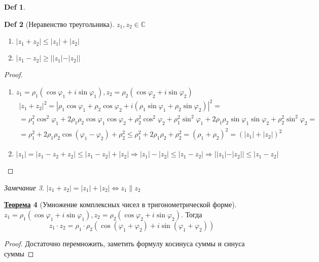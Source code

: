 \documentclass[12pt]{article}
\newenvironment{MyList}[1][4pt]{
  \begin{enumerate}[1.]
  \setlength{\parskip}{0pt}
  \setlength{\itemsep}{#1}
}{       
  \end{enumerate}
}
\def\C{\mathbb{C}}       %
\def\PHI{\varphi}        %
\def\SO{\Rightarrow}     %
\def\EQ{\Leftrightarrow} %
\def\Pagebreak{\pagebreak\vspace*{-1.5em}}
\theoremstyle{definition} %
\newtheorem{Thm}{\underline{Теорема}}[subsection] %
\theoremstyle{plain} %
\newtheorem{Def}[Thm]{Def} %
\theoremstyle{remark} %
\newtheorem{Rem}[Thm]{Замечание} %
\begin{document}
{\begin{Def}
\end{Def} 

\begin{Def}[Неравенство треугольника]
    $z_1, z_2 \in \C$
    \begin{MyList}
        \item $|z_1 + z_2| \leqslant |z_1| + |z_2|$
        \item $|z_1 - z_2| \geqslant ||z_1| - |z_2||$  
    \end{MyList} 
\end{Def}

\begin{proof}
    \begin{MyList}
        \item $z_1 = \rho_1(\cos \PHI_1 + i\sin \PHI_1), z_2 = \rho_2(\cos \PHI_2 + i\sin \PHI_2)$ \\
        \begin{gather*}
            |z_1 + z_2|^2 = |\rho_1 \cos \PHI_1 + \rho_2 \cos \PHI_2 + i(\rho_1 \sin \PHI_1 + \rho_2 \sin \PHI_2)|^2 = \\
            = \rho_1^2 \cos^2 \PHI_1 + 2 \rho_1 \rho_2 \cos \PHI_1 \cos \PHI_2 + \rho_2^2 \cos^2 \PHI_2 + \rho_1^2 \sin^2 \PHI_1 + 2 \rho_1 \rho_2 \sin \PHI_1 \sin \PHI_2 + \rho_2^2 \sin^2 \PHI_2 = \\
            = \rho_1^2 + 2\rho_1 \rho_2 \cos(\PHI_1 - \PHI_2) + \rho_2^2 \leqslant \rho_1^2 + 2\rho_1 \rho_2 + \rho_2^2 = (\rho_1 + \rho_2)^2 = (|z_1| + |z_2|)^2
        \end{gather*}

        \item \[
            |z_1| = |z_1 - z_2 + z_2| \leqslant |z_1 - z_2| + |z_2| \SO |z_1| - |z_2| \leqslant |z_1 - z_2| \SO ||z_1| - |z_2|| \leqslant |z_1 - z_2|
        \]
    \end{MyList}
\end{proof}

\begin{Rem}
    $|z_1 + z_2| = |z_1| + |z_2| \EQ z_1 \parallel z_2$ 
\end{Rem}

\Pagebreak
\begin{Thm}[Умножение комплексных чисел в тригонометрической форме]
    $z_1 = \rho_1 (\cos \PHI_1 + i\sin \PHI_1), z_2 = \rho_2 (\cos \PHI_2 + i\sin \PHI_2)$. Тогда 
    \[z_1 \cdot z_2 = \rho_1 \cdot \rho_2 (\cos (\PHI_1 + \PHI_2) + i\sin (\PHI_1 + \PHI_2))\] 
\end{Thm}

\begin{proof}
    Достаточно перемножить, заметить формулу косинуса суммы и синуса суммы
\end{proof}

}
\end{document}
